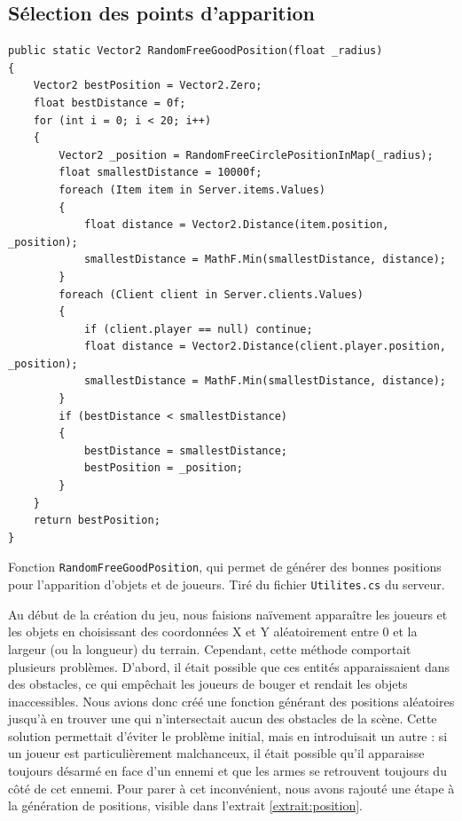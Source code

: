 \documentclass[a4paper]{article}
\begin{document}
\subsection{Sélection des points d'apparition}
\begin{listing}[H]
\begin{verbatim}
public static Vector2 RandomFreeGoodPosition(float _radius)
{
    Vector2 bestPosition = Vector2.Zero;
    float bestDistance = 0f;
    for (int i = 0; i < 20; i++)
    {
        Vector2 _position = RandomFreeCirclePositionInMap(_radius);
        float smallestDistance = 10000f;
        foreach (Item item in Server.items.Values)
        {
            float distance = Vector2.Distance(item.position, _position);
            smallestDistance = MathF.Min(smallestDistance, distance);
        }
        foreach (Client client in Server.clients.Values)
        {
            if (client.player == null) continue;
            float distance = Vector2.Distance(client.player.position, _position);
            smallestDistance = MathF.Min(smallestDistance, distance);
        }
        if (bestDistance < smallestDistance)
        {
            bestDistance = smallestDistance;
            bestPosition = _position;
        }
    }
    return bestPosition;
}
\end{verbatim}
\caption{Fonction \texttt{RandomFreeGoodPosition}, qui permet de générer des bonnes positions pour l'apparition d'objets et de joueurs. Tiré du fichier  \texttt{Utilites.cs} du serveur.}
\label{extrait:position}
\end{listing}
\noindent
Au début de la création du jeu, nous faisions naïvement apparaître les joueurs et les objets en choisissant des coordonnées X et Y aléatoirement entre 0 et la largeur (ou la longueur) du terrain. Cependant, cette méthode comportait plusieurs problèmes. D'abord, il était possible que ces entités apparaissaient dans des obstacles, ce qui empêchait les joueurs de bouger et rendait les objets inaccessibles. Nous avions donc créé une fonction générant des positions aléatoires jusqu'à en trouver une qui n'intersectait aucun des obstacles de la scène. Cette solution permettait d'éviter le problème initial, mais en introduisait un autre : si un joueur est particulièrement malchanceux, il était possible qu'il apparaisse toujours désarmé en face d'un ennemi et que les armes se retrouvent toujours du côté de cet ennemi. Pour parer à cet inconvénient, nous avons rajouté une étape à la génération de positions, visible dans l'extrait \ref{extrait:position}. \\
\end{document}
